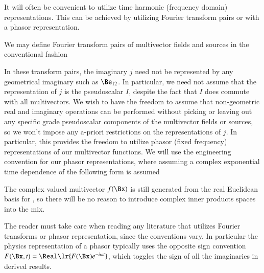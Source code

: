 %
%
\label{fourier}
It will often be convenient to utilize time harmonic (frequency domain) representations.
This can be achieved by utilizing Fourier transform pairs or with a phasor representation.

We may define Fourier transform pairs of multivector fields and sources in the conventional fashion



In these transform pairs, the imaginary \( j \) need not be represented by any geometrical imaginary such as \( \Be_{12} \).
In particular, we need not assume that the representation of \( j \) is the
 pseudoscalar \( I \), despite the fact that \( I \) does commute with all  multivectors.
We wish to have the freedom to
assume that non-geometric real and imaginary operations can be performed without picking or leaving out any specific grade pseudoscalar components of the multivector fields or sources, so we won't impose any a-priori restrictions on the representations of \( j \).
In particular, this provides the freedom to utilize phasor (fixed frequency) representations of our multivector functions.
We will use the engineering convention for our
phasor representations, where assuming a complex exponential time dependence of the following form is assumed



The complex valued multivector \( f(\Bx) \) is still generated from the real Euclidean basis for , so
there will be
no reason to introduce complex inner products spaces into the mix.

The reader must take care when reading any literature that utilizes Fourier transforms or phasor representation, since the conventions vary.
In particular the physics representation of a phasor typically uses the opposite sign convention
\( F(\Bx, t) = \Real\lr{ F(\Bx) e^{-i \omega t }} \), which toggles the sign of all the imaginaries in derived results.

